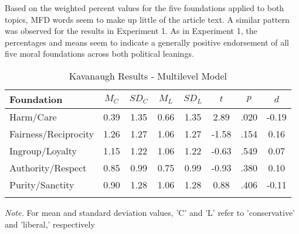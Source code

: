 \documentclass[english,,man]{apa6}
\begin{document}
Based on the weighted percent values for the five foundations applied to both topics, MFD words seem to make up little of the article text. A similar pattern was observed for the results in Experiment 1. As in Experiment 1, the percentages and means seem to indicate a generally positive endorsement of all five moral foundations across both political leanings.

\begin{table}[tbp]

\begin{center}
\begin{threeparttable}

\caption{\label{tab:exp2-tablekav}Kavanaugh Results - Multilevel Model}

\begin{tabular}{lccccccc}
\toprule
Foundation & $M_C$ & $SD_C$ & $M_L$ & $SD_L$ & $t$ & $p$ & $d$\\
\midrule
Harm/Care & 0.39 & 1.35 & 0.66 & 1.35 & 2.89 & .020 & -0.19\\
Fairness/Reciprocity & 1.26 & 1.27 & 1.06 & 1.27 & -1.58 & .154 & 0.16\\
Ingroup/Loyalty & 1.15 & 1.22 & 1.06 & 1.22 & -0.63 & .549 & 0.07\\
Authority/Respect & 0.85 & 0.99 & 0.75 & 0.99 & -0.93 & .380 & 0.10\\
Purity/Sanctity & 0.90 & 1.28 & 1.06 & 1.28 & 0.88 & .406 & -0.11\\
\bottomrule
\addlinespace
\end{tabular}

\begin{tablenotes}[para]
\normalsize{\textit{Note.} For mean and standard deviation values, 'C' and 'L' refer to 'conservative' and 'liberal,' respectively}
\end{tablenotes}

\end{threeparttable}
\end{center}

\end{table}
\end{document}
